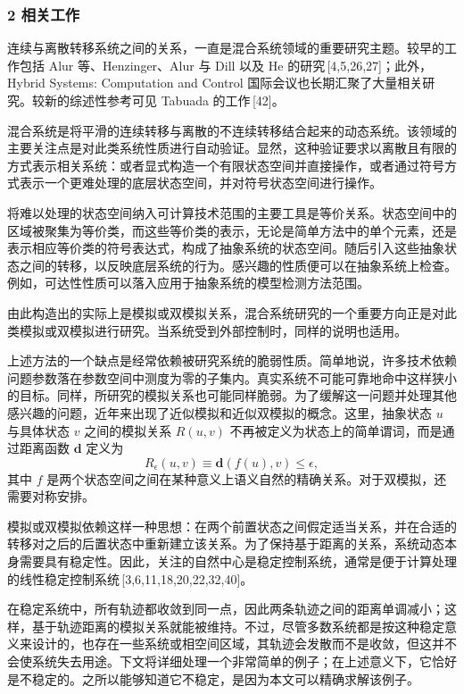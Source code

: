 {\subsubsection*{2 相关工作}

\indent 连续与离散转移系统之间的关系，一直是混合系统领域的重要研究主题。较早的工作包括 Alur 等、Henzinger、Alur 与 Dill 以及 He 的研究\,[4,5,26,27]；此外，Hybrid Systems: Computation and Control 国际会议也长期汇聚了大量相关研究。较新的综述性参考可见 Tabuada 的工作\,[42]。

\indent 混合系统是将平滑的连续转移与离散的不连续转移结合起来的动态系统。该领域的主要关注点是对此类系统性质进行自动验证。显然，这种验证要求以离散且有限的方式表示相关系统：或者显式构造一个有限状态空间并直接操作，或者通过符号方式表示一个更难处理的底层状态空间，并对符号状态空间进行操作。

\indent 将难以处理的状态空间纳入可计算技术范围的主要工具是等价关系。状态空间中的区域被聚集为等价类，而这些等价类的表示，无论是简单方法中的单个元素，还是表示相应等价类的符号表达式，构成了抽象系统的状态空间。随后引入这些抽象状态之间的转移，以反映底层系统的行为。感兴趣的性质便可以在抽象系统上检查。例如，可达性性质可以落入应用于抽象系统的模型检测方法范围。

\indent 由此构造出的实际上是模拟或双模拟关系，混合系统研究的一个重要方向正是对此类模拟或双模拟进行研究。当系统受到外部控制时，同样的说明也适用。

\indent 上述方法的一个缺点是经常依赖被研究系统的脆弱性质。简单地说，许多技术依赖问题参数落在参数空间中测度为零的子集内。真实系统不可能可靠地命中这样狭小的目标。同样，所研究的模拟关系也可能同样脆弱。为了缓解这一问题并处理其他感兴趣的问题，近年来出现了近似模拟和近似双模拟的概念。这里，抽象状态 $u$ 与具体状态 $v$ 之间的模拟关系 $R(u,v)$ 不再被定义为状态上的简单谓词，而是通过距离函数 $\mathbf{d}$ 定义为
\[
R_{\epsilon}(u,v) \equiv \mathbf{d}(f(u),v) \leq \epsilon ,
\]
其中 $f$ 是两个状态空间之间在某种意义上语义自然的精确关系。对于双模拟，还需要对称安排。

\indent 模拟或双模拟依赖这样一种思想：在两个前置状态之间假定适当关系，并在合适的转移对之后的后置状态中重新建立该关系。为了保持基于距离的关系，系统动态本身需要具有稳定性。因此，关注的自然中心是稳定控制系统，通常是便于计算处理的线性稳定控制系统\,[3,6,11,18,20,22,32,40]。

\indent 在稳定系统中，所有轨迹都收敛到同一点，因此两条轨迹之间的距离单调减小；这样，基于轨迹距离的模拟关系就能被维持。不过，尽管多数系统都是按这种稳定意义来设计的，也存在一些系统或相空间区域，其轨迹会发散而不是收敛，但这并不会使系统失去用途。下文将详细处理一个非常简单的例子；在上述意义下，它恰好是不稳定的。之所以能够知道它不稳定，是因为本文可以精确求解该例子。

}
